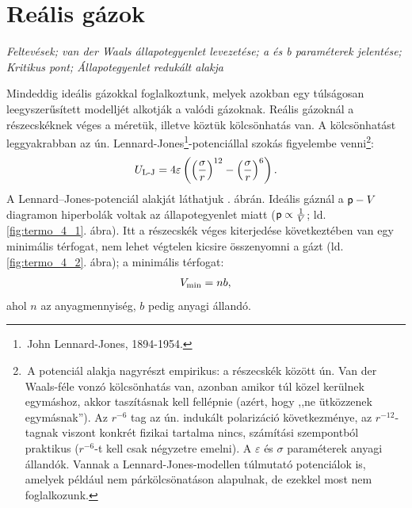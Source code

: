 \section{Reális gázok}

\emph{Feltevések; van der Waals állapotegyenlet levezetése; a és b paraméterek jelentése; Kritikus pont; Állapotegyenlet redukált alakja}

Mindeddig ideális gázokkal foglalkoztunk, melyek azokban egy túlságosan leegyszerűsített modelljét alkotják a valódi gázoknak. Reális gázoknál a részecskéknek véges a méretük, illetve köztük kölcsönhatás van. A kölcsönhatást leggyakrabban az ún. Lennard-Jones\footnote{\,John Lennard-Jones, 1894-1954.}-potenciállal szokás figyelembe venni\footnote{\,A potenciál alakja nagyrészt empirikus: a részecskék között ún. Van der Waals-féle vonzó kölcsönhatás van, azonban amikor túl közel kerülnek egymáshoz, akkor taszításnak kell fellépnie (azért, hogy ,,ne ütközzenek egymásnak''). Az $r^{-6}$ tag az ún. indukált polarizáció következménye, az $r^{-12}$-tagnak viszont konkrét fizikai tartalma nincs, számítási szempontból praktikus ($r^{-6}$-t kell csak négyzetre emelni). A $\varepsilon$ és $\sigma$ paraméterek anyagi állandók. Vannak a Lennard-Jones-modellen túlmutató potenciálok is, amelyek például nem párkölcsönatáson alapulnak, de ezekkel most nem foglalkozunk.}:
\begin{align}
    U_{\textnormal{L-J}} = 4\varepsilon\left({\left({\frac{\sigma}{r}}\right)^{12}-\left({\frac{\sigma}{r}}\right)^6}\right).
\end{align} 
A Lennard--Jones-potenciál alakját láthatjuk . ábrán. Ideális gáznál a $\mathsf p-V$ diagramon hiperbolák voltak az állapotegyenlet miatt ($\mathsf p\propto \frac{1}{V}$; ld. \ref{fig:termo_4_1}. ábra). Itt a részecskék véges kiterjedése következtében van egy minimális térfogat, nem lehet végtelen kicsire összenyomni a gázt (ld. \ref{fig:termo_4_2}. ábra); a minimális térfogat:
\begin{align}
    V_{\textnormal{min}} = nb,
\end{align}
ahol $n$ az anyagmennyiség, $b$ pedig anyagi állandó.
